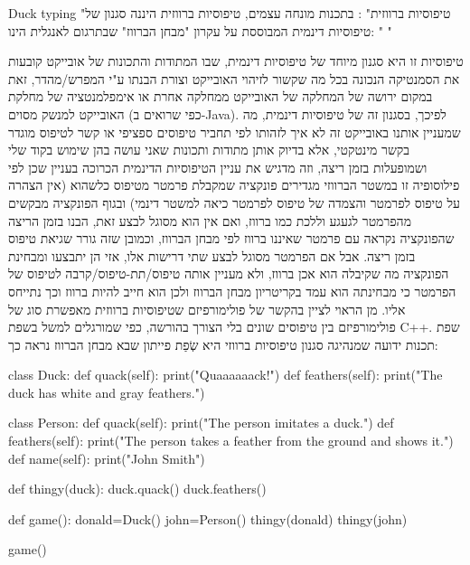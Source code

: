       Duck typing "טיפוסיות ברווזית" :
      בתכנות מונחה עצמים, טיפוסיות ברווזית היננה סגנון של טיפוסיות דינמית המבוססת על עקרון "מבחן הברווז" שבתרגום לאנגלית הינו:
      " "

      טיפוסיות זו היא סגנון מיוחד של טיפוסיות דינמית, שבו המתודות והתכונות של אובייקט
      קובעות את הסמנטיקה הנכונה בכל מה שקשור לזיהוי האובייקט וצורת הבנתו ע"י
      המפרש/מהדר, זאת במקום ירושה של המחלקה של האובייקט ממחלקה אחרת או אימפלמנטציה של
      מחלקת האובייקט למנשק מסוים (כפי שרואים ב-Java). לפיכך, בסגנון זה של טיפוסיות
      דינמית, מה שמעניין אותנו באובייקט זה לא איך לזהותו לפי תחביר טיפוסים ספציפי או
      קשר לטיפוס מוגדר בקשר מינטקטי, אלא בדיוק אותן מתודות ותכונות שאני עושה בהן
      שימוש בקוד שלי ושמופעלות בזמן ריצה, וזה מדגיש את עניין הטיפוסיות הדינמית הכרוכה
      בעניין שכן לפי פילוסופיה זו במשטר הברווזי מגדירים פונקציה שמקבלת פרמטר מטיפוס
      כלשהוא (אין הצהרה על טיפוס לפרמטר והצמדה של טיפוס לפרמטר כיאה למשטר דינמי)
      ובגוף הפונקציה מבקשים מהפרמטר לגעגע וללכת כמו ברווז, ואם אין הוא מסוגל לבצע
      זאת, הבנו בזמן הריצה שהפונקציה נקראה עם פרמטר שאיננו ברווז לפי מבחן הברווז,
      וכמובן שזה גורר שגיאת טיפוס בזמן ריצה. אבל אם הפרמטר מסוגל לבצע שתי דרישות אלו,
      אזי הן יתבצעו ומבחינת הפונקציה מה שקיבלה הוא אכן ברווז, ולא מעניין אותה
      טיפוס/תת-טיפוס/קרבה לטיפוס של הפרמטר כי מבחינתה הוא עמד בקריטריון מבחן הברווז
      ולכן הוא חייב להיות ברווז וכך נתייחס אליו. מן הראוי לציין בהקשר של פולימורפיזם
      שטיפוסיות ברווזית מאפשרת סוג של פולימורפיזם בין טיפוסים שונים בלי הצורך בהורשה,
      כפי שמורגלים למשל בשפת C++. שפת תכנות ידועה שמנהיגה סגנון טיפוסיות ברווזי היא
      שְׂפַת פייתון \Python שבא מבחן הברווז נראה כך:

\begin{PYTHON}
class Duck:
   def quack(self):
       print("Quaaaaaack!")
   def feathers(self):
       print("The duck has white and gray feathers.")

class Person:
   def quack(self):
       print("The person imitates a duck.")
   def feathers(self):
       print("The person takes a feather from the ground and shows it.")
   def name(self):
       print("John Smith")

def thingy(duck):
   duck.quack()
   duck.feathers()

def game():
   donald=Duck()
   john=Person()
   thingy(donald)
   thingy(john)

game()
\end{PYTHON}

